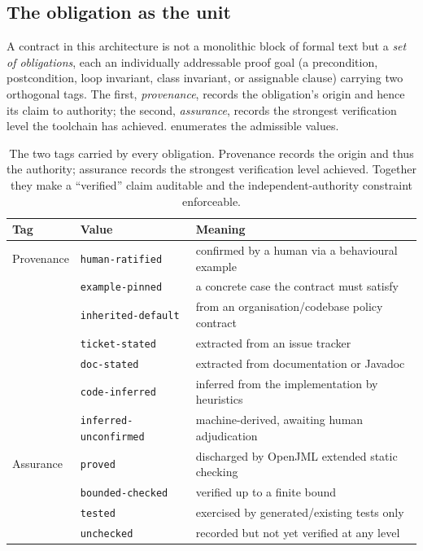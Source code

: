 \subsection{The obligation as the unit}\label{subsec:a5-obligation}

A contract in this architecture is not a monolithic block of formal text but a \emph{set of obligations}, each an individually addressable proof goal (a precondition, postcondition, loop invariant, class invariant, or assignable clause) carrying two orthogonal tags. The first, \emph{provenance}, records the obligation's origin and hence its claim to authority; the second, \emph{assurance}, records the strongest verification level the toolchain has achieved.  enumerates the admissible values.

\begin{table}[t]
  \centering
  \caption{The two tags carried by every obligation. Provenance records the origin and thus the authority; assurance records the strongest verification level achieved. Together they make a ``verified'' claim auditable and the independent-authority constraint enforceable.}
  \label{tab:a5-tags}
  \begin{tabular}{@{}lll@{}}
    \toprule
    Tag & Value & Meaning \\
    \midrule
    Provenance & \texttt{human-ratified}       & confirmed by a human via a behavioural example \\
               & \texttt{example-pinned}       & a concrete case the contract must satisfy \\
               & \texttt{inherited-default}    & from an organisation/codebase policy contract \\
               & \texttt{ticket-stated}        & extracted from an issue tracker \\
               & \texttt{doc-stated}           & extracted from documentation or Javadoc \\
               & \texttt{code-inferred}        & inferred from the implementation by heuristics \\
               & \texttt{inferred-unconfirmed} & machine-derived, awaiting human adjudication \\
    \midrule
    Assurance  & \texttt{proved}          & discharged by OpenJML extended static checking \\
               & \texttt{bounded-checked} & verified up to a finite bound \\
               & \texttt{tested}          & exercised by generated/existing tests only \\
               & \texttt{unchecked}       & recorded but not yet verified at any level \\
    \bottomrule
  \end{tabular}
\end{table}

